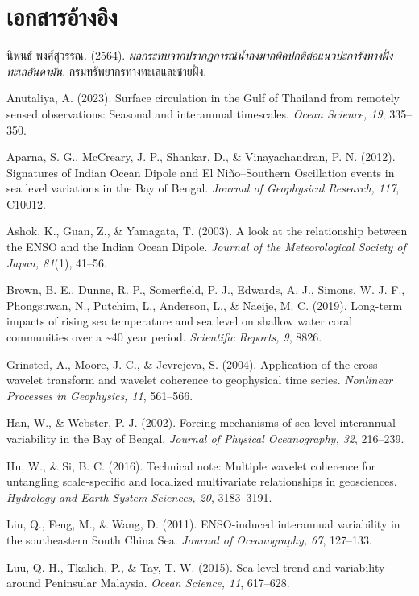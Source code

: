 \documentclass[a4paper,11pt]{article}
\newcommand{\centerheading}[1]{\section*{#1}}
\begin{document}
\centerheading{เอกสารอ้างอิง}

\begingroup
\setlength{\parindent}{0pt}
\setlength{\parskip}{0.3em}
\small

นิพนธ์ พงศ์สุวรรณ. (2564). \textit{ผลกระทบจากปรากฏการณ์น้ำลงมากผิดปกติต่อแนวปะการังทางฝั่งทะเลอันดามัน}.
กรมทรัพยากรทางทะเลและชายฝั่ง.

Anutaliya, A. (2023). Surface circulation in the Gulf of Thailand from remotely sensed observations: Seasonal and interannual
timescales. \textit{Ocean Science, 19}, 335–350.

Aparna, S. G., McCreary, J. P., Shankar, D., \& Vinayachandran, P. N. (2012). Signatures of Indian Ocean Dipole and
El Niño–Southern Oscillation events in sea level variations in the Bay of Bengal. \textit{Journal of Geophysical Research, 117}, C10012.

Ashok, K., Guan, Z., \& Yamagata, T. (2003). A look at the relationship between the ENSO and the Indian Ocean Dipole.
\textit{Journal of the Meteorological Society of Japan, 81}(1), 41–56.

Brown, B. E., Dunne, R. P., Somerfield, P. J., Edwards, A. J., Simons, W. J. F., Phongsuwan, N., Putchim, L., Anderson, L.,
\& Naeije, M. C. (2019). Long-term impacts of rising sea temperature and sea level on shallow water coral communities over
a \textasciitilde 40 year period. \textit{Scientific Reports, 9}, 8826.

Grinsted, A., Moore, J. C., \& Jevrejeva, S. (2004). Application of the cross wavelet transform and wavelet coherence to
geophysical time series. \textit{Nonlinear Processes in Geophysics, 11}, 561–566.

Han, W., \& Webster, P. J. (2002). Forcing mechanisms of sea level interannual variability in the Bay of Bengal.
\textit{Journal of Physical Oceanography, 32}, 216–239.

Hu, W., \& Si, B. C. (2016). Technical note: Multiple wavelet coherence for untangling scale-specific and localized
multivariate relationships in geosciences. \textit{Hydrology and Earth System Sciences, 20}, 3183–3191.

Liu, Q., Feng, M., \& Wang, D. (2011). ENSO-induced interannual variability in the southeastern South China Sea.
\textit{Journal of Oceanography, 67}, 127–133.

Luu, Q. H., Tkalich, P., \& Tay, T. W. (2015). Sea level trend and variability around Peninsular Malaysia.
\textit{Ocean Science, 11}, 617–628.
\end{document}
